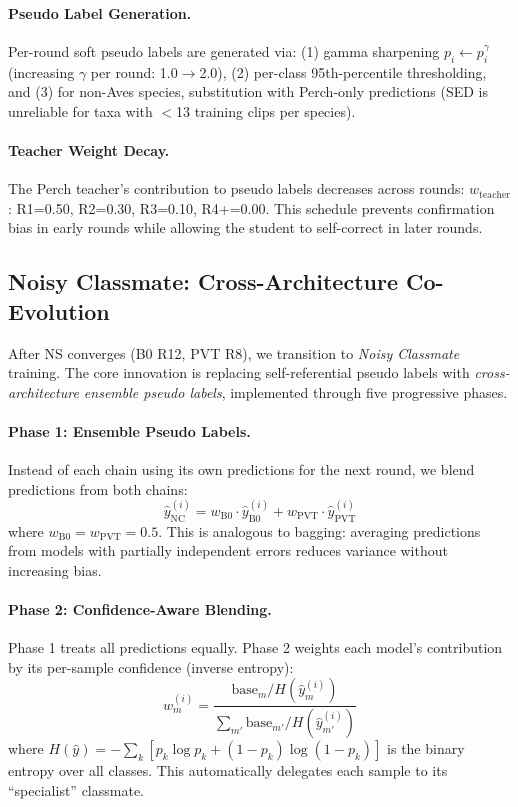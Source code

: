 \documentclass[a4paper]{article}
\begin{document}
\paragraph{Pseudo Label Generation.}
Per-round soft pseudo labels are generated via:
(1) gamma sharpening $p_i \leftarrow p_i^\gamma$ (increasing $\gamma$ per round: 1.0$\to$2.0),
(2) per-class 95th-percentile thresholding, and
(3) for non-Aves species, substitution with Perch-only predictions (SED is unreliable for taxa with $<$13 training clips per species).

\paragraph{Teacher Weight Decay.}
The Perch teacher's contribution to pseudo labels decreases across rounds:
$w_\text{teacher}$: R1=0.50, R2=0.30, R3=0.10, R4+=0.00.
This schedule prevents confirmation bias in early rounds while allowing the student to self-correct in later rounds.

\subsection{Noisy Classmate: Cross-Architecture Co-Evolution}
\label{sec:nc}

After NS converges (B0 R12, PVT R8), we transition to \emph{Noisy Classmate} training.
The core innovation is replacing self-referential pseudo labels with \emph{cross-architecture ensemble pseudo labels}, implemented through five progressive phases.

\paragraph{Phase 1: Ensemble Pseudo Labels.}
Instead of each chain using its own predictions for the next round, we blend predictions from both chains:
\begin{equation}
\hat{y}_\text{NC}^{(i)} = w_\text{B0} \cdot \hat{y}_\text{B0}^{(i)} + w_\text{PVT} \cdot \hat{y}_\text{PVT}^{(i)}
\end{equation}
where $w_\text{B0} = w_\text{PVT} = 0.5$. This is analogous to bagging: averaging predictions from models with partially independent errors reduces variance without increasing bias.

\paragraph{Phase 2: Confidence-Aware Blending.}
Phase 1 treats all predictions equally. Phase 2 weights each model's contribution by its per-sample confidence (inverse entropy):
\begin{equation}
w_m^{(i)} = \frac{\text{base}_m / H(\hat{y}_m^{(i)})}{\sum_{m'} \text{base}_{m'} / H(\hat{y}_{m'}^{(i)})}
\end{equation}
where $H(\hat{y}) = -\sum_k [p_k \log p_k + (1-p_k)\log(1-p_k)]$ is the binary entropy over all classes.
This automatically delegates each sample to its ``specialist'' classmate.
\end{document}
